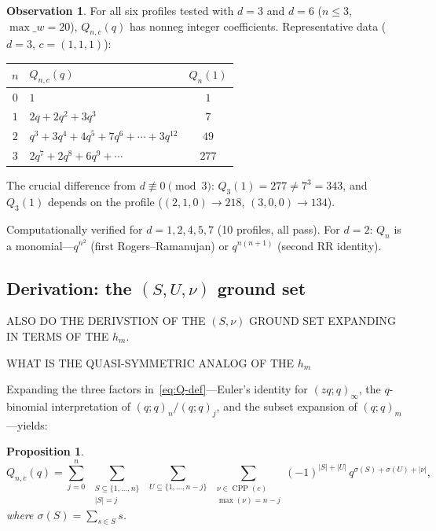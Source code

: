 \documentclass[11pt]{article}
\theoremstyle{plain}
\newtheorem{proposition}[theorem]{Proposition}
\theoremstyle{definition}
\newtheorem{observation}[theorem]{Observation}
\theoremstyle{remark}
\newcommand{\CPP}{\operatorname{CPP}}
\newcommand{\qpoch}[2]{(#1;#2)_\infty}
\newcommand{\qpochn}[3]{(#1;#2)_{#3}}
\begin{document}
\begin{observation}\label{obs:d0mod3}
For all six profiles tested with $d = 3$ and $d = 6$
($n \leq 3$, $\max\_w = 20$),
$Q_{n,c}(q)$ has nonneg integer coefficients.
Representative data ($d = 3$, $c = (1,1,1)$):
\begin{center}
\begin{tabular}{c|l|c}
$n$ & $Q_{n,c}(q)$ & $Q_n(1)$ \\\hline
$0$ & $1$ & $1$ \\
$1$ & $2q + 2q^2 + 3q^3$ & $7$ \\
$2$ & $q^3 + 3q^4 + 4q^5 + 7q^6 + \cdots + 3q^{12}$ & $49$ \\
$3$ & $2q^7 + 2q^8 + 6q^9 + \cdots$ & $277$
\end{tabular}
\end{center}
The crucial difference from $d \not\equiv 0 \pmod{3}$:
$Q_3(1) = 277 \neq 7^3 = 343$, and $Q_3(1)$ depends
on the profile ($(2,1,0) \to 218$, $(3,0,0) \to 134$).
\end{observation}

Computationally verified for $d = 1,2,4,5,7$
(10 profiles, all pass).
For $d = 2$: $Q_n$ is a monomial---$q^{n^2}$ (first
Rogers--Ramanujan) or $q^{n(n+1)}$ (second RR identity).

\subsection{Derivation: the $(S, U, \nu)$ ground set}

ALSO DO THE DERIVSTION OF THE $(S,\nu)$ GROUND SET
EXPANDING IN TERMS OF THE $h_m$.

WHAT IS THE QUASI-SYMMETRIC ANALOG OF THE $h_m$

Expanding the three factors in~\eqref{eq:Q-def}---Euler's
identity for $\qpoch{zq}{q}$, the $q$-binomial interpretation
of $\qpochn{q}{q}{n}/\qpochn{q}{q}{j}$, and the subset expansion
of $\qpochn{q}{q}{m}$---yields:

\begin{proposition}\label{prop:ground-set}
\begin{equation}\label{eq:ground-set}
  Q_{n,c}(q) = \sum_{j=0}^{n}\;
  \sum_{\substack{S \subseteq \{1,\ldots,n\} \\ |S|=j}}\;
  \sum_{U \subseteq \{1,\ldots,n-j\}}\;
  \sum_{\substack{\nu \in \CPP(c) \\ \max(\nu) = n-j}}
  (-1)^{|S|+|U|}\, q^{\sigma(S)+\sigma(U)+|\nu|},
\end{equation}
where $\sigma(S) = \sum_{s \in S} s$.
\end{proposition}
\end{document}
